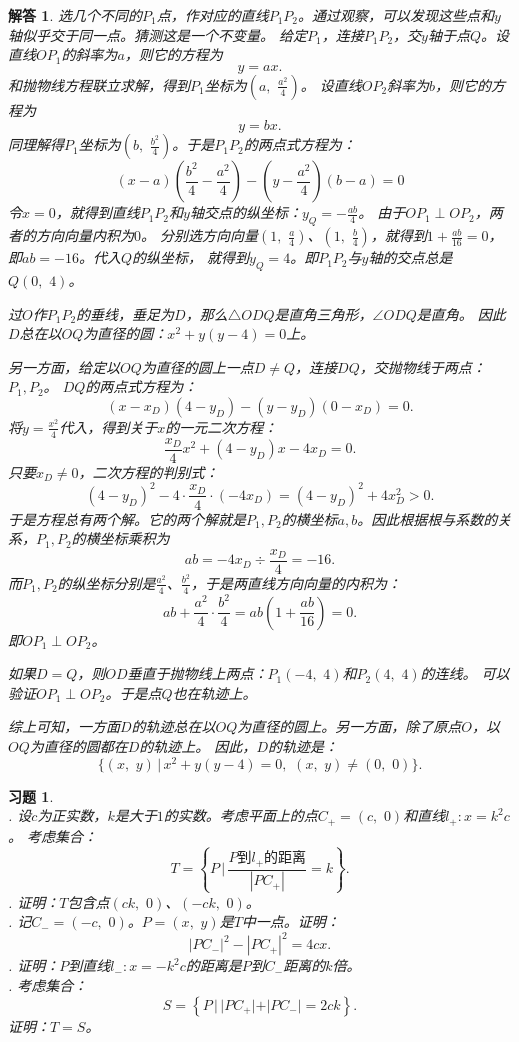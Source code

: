 \documentclass[12pt,UTF8]{ctexbook}
\newtheorem*{so}{解答}
\newtheorem{xt}{习题}[section]
\begin{document}
\begin{so}
    选几个不同的$P_1$点，作对应的直线$P_1P_2$。通过观察，可以发现这些点和$y$轴似乎交于同一点。猜测这是一个不变量。
    给定$P_1$，连接$P_1P_2$，交$y$轴于点$Q$。设直线$OP_1$的斜率为$a$，则它的方程为
    $$ y = ax. $$
    和抛物线方程联立求解，得到$P_1$坐标为$(a, \,\, \frac{a^2}{4})$。
    设直线$OP_2$斜率为$b$，则它的方程为
    $$ y = bx. $$
    同理解得$P_1$坐标为$(b, \,\, \frac{b^2}{4})$。于是$P_1P_2$的两点式方程为：
    $$ (x - a)(\frac{b^2}{4} - \frac{a^2}{4}) - (y - \frac{a^2}{4})(b - a) = 0$$
    令$x=0$，就得到直线$P_1P_2$和$y$轴交点的纵坐标：$y_Q = -\frac{ab}{4}$。
    由于$OP_1 \perp OP_2$，两者的方向向量内积为$0$。
    分别选方向向量$(1,\,\,\frac{a}{4})$、$(1,\,\,\frac{b}{4})$，就得到$1 + \frac{ab}{16} = 0$，即$ab = -16$。代入$Q$的纵坐标，
    就得到$y_Q = 4$。即$P_1P_2$与$y$轴的交点总是$Q(0,\,\,4)$。

    过$O$作$P_1P_2$的垂线，垂足为$D$，那么$\triangle ODQ$是直角三角形，$\angle ODQ$是直角。
    因此$D$总在以$OQ$为直径的圆：$x^2 + y(y-4) = 0$上。

    另一方面，给定以$OQ$为直径的圆上一点$D\neq Q$，连接$DQ$，交抛物线于两点：$P_1,P_2$。
    $DQ$的两点式方程为：
    $$ (x - x_D)(4 - y_D) - (y - y_D)(0 - x_D) = 0.$$
    将$y = \frac{x^2}{4}$代入，得到关于$x$的一元二次方程：
    $$ \frac{x_D}{4}x^2 + \left(4 - y_D\right)x - 4x_D = 0.$$
    只要$x_D\neq 0$，二次方程的判别式：
    $$ (4 - y_D)^2 - 4\cdot \frac{x_D}{4}\cdot(- 4x_D) = (4 - y_D)^2 + 4x_D^2 > 0.$$
    于是方程总有两个解。它的两个解就是$P_1,P_2$的横坐标$a,b$。因此根据根与系数的关系，$P_1,P_2$的横坐标乘积为
    $$ab = -4x_D \div \frac{x_D}{4} = -16.$$
    而$P_1,P_2$的纵坐标分别是$\frac{a^2}{4}$、$\frac{b^2}{4}$，于是两直线方向向量的内积为：
    $$ ab + \frac{a^2}{4}\cdot\frac{b^2}{4} = ab(1 + \frac{ab}{16}) = 0.$$
    即$OP_1 \perp OP_2$。
    
    如果$D=Q$，则$OD$垂直于抛物线上两点：$P_1(-4,\,\,4)$和$P_2(4,\,\,4)$的连线。
    可以验证$OP_1\perp OP_2$。于是点$Q$也在轨迹上。
    
    综上可知，一方面$D$的轨迹总在以$OQ$为直径的圆上。另一方面，除了原点$O$，以$OQ$为直径的圆都在$D$的轨迹上。
    因此，$D$的轨迹是：
    $$\{(x,\,\,y) \, | \, x^2 + y(y-4) = 0, \,\, (x,\,\,y)\neq (0,\,\,0)\}.$$
\end{so}

\begin{xt}
    \mbox{} \\
    . 设$c$为正实数，$k$是大于$1$的实数。考虑平面上的点$C_+ = (c,\,\, 0)$和直线$l_+ : x = k^2c$。
    考虑集合：
    $$T = \left\{P\,| \, \frac{P\mbox{到}l_+的距离}{|PC_+|} = k\right\}.$$
    . 证明：$T$包含点$(ck, \,\,0)$、$(-ck,\,\,0)$。\\
    . 记$C_- = (-c,\,\,0)$。$P = (x,\,\, y)$是$T$中一点。证明：
    $$ |PC_-|^2 - |PC_+|^2 = 4cx.$$
    . 证明：$P$到直线$l_-: x = -k^2c$的距离是$P$到$C_-$距离的$k$倍。\\
    . 考虑集合：
    $$ S = \left\{P\,| \, |PC_+| + |PC_-| = 2ck\right\}.$$
    证明：$T = S$。
\end{xt}
\end{document}
